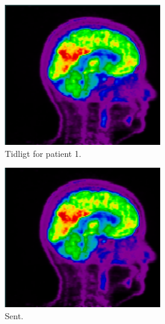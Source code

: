 \begin{figure}[H]
    \centering
    \begin{subfigure}{0.3\textwidth}
        \centering
        \includegraphics[width=0.75\textwidth]{colager/over_tid_pet/over_tid_121280_early.png}
        \caption{Tidligt for patient 1.}
        \label{col:over_time_pet_pat1_early}
    \end{subfigure}\hfill
    \begin{subfigure}{0.3\textwidth}
        \centering
        \includegraphics[width=0.75\textwidth]{colager/over_tid_pet/over_tid_121280_late.png}
        \caption{Sent.}
        \label{col:over_time_pet_pat1_late}
    \end{subfigure}\hfill
    \begin{subfigure}{0.3\textwidth}
        \centering

\end{subfigure}
\end{figure}
